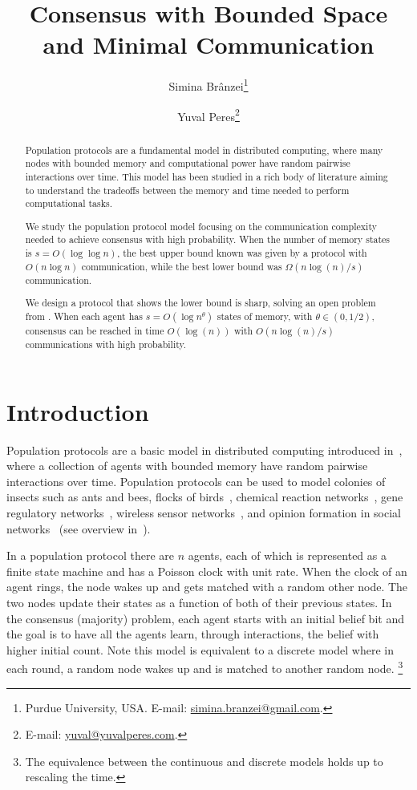 \documentclass[a4paper,12pt]{article}
\title{Consensus with Bounded Space and Minimal Communication}
\author{Simina Br\^anzei\thanks{Purdue University, USA. E-mail: \url{simina.branzei@gmail.com}.} \and Yuval Peres\thanks{E-mail: \url{yuval@yuvalperes.com}.}}
\date{}
\begin{document}
\maketitle

\begin{abstract}
	Population protocols are a fundamental model in distributed computing, where many nodes with bounded memory and computational power have random pairwise interactions over time. This model has been studied in a rich body of literature aiming to understand the tradeoffs between the memory and time needed to perform computational tasks.
	
	We study the population protocol model focusing on the communication complexity needed to achieve consensus with high probability. When the number of memory states is $s = O(\log \log{n})$, the best upper bound known was given by a protocol with $O(n \log{n})$ communication, while the best lower bound was $\Omega(n \log(n)/s)$ communication. %
	
	We design a protocol that shows the lower bound is sharp, solving an open problem from \cite{comm_init}. When each agent has  $s=O(\log{n}^{\theta})$ states of memory, with $\theta \in (0,1/2)$, consensus can be reached in time $O(\log(n))$ with $O(n \log{(n)}/s)$ communications with high probability.
\end{abstract}

\newpage 
\section{Introduction}
Population protocols are a basic model in distributed computing introduced in~\cite{AADFP04}, where a collection of agents with bounded memory have random pairwise interactions over time. Population protocols can be used to model colonies of insects such as ants and bees, flocks of birds~\cite{AADFP04,DFGR06}, chemical reaction networks~\cite{CardelliHDC17}, gene regulatory networks~\cite{BB04}, wireless sensor networks~\cite{DV12}, and opinion formation in social networks~\cite{PVV09} (see overview in~\cite{AAEGR17}). 

In a population protocol there are $n$ agents, each of which is represented as a finite state machine and has a Poisson clock with unit rate. When the clock of an agent rings, the node wakes up and gets matched with a random other node. The two nodes update their states as a function of both of their previous states. %
In the consensus (majority) problem, each agent starts with an initial belief bit and the goal is to have all the agents learn, through interactions, the belief with higher initial count. Note this model is equivalent to a discrete model where in each round, a random node wakes up and is matched to another random node. \footnote{The equivalence between the continuous and discrete models holds up to rescaling the time.}
\end{document}
